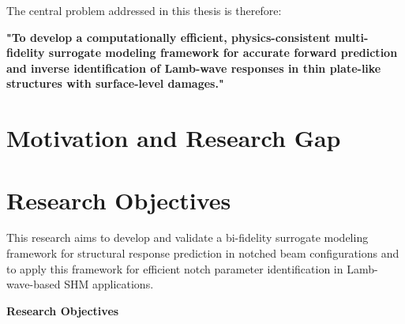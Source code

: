 \documentclass[12pt,a4paper]{report}
\begin{document}
The central problem addressed in this thesis is therefore:

\medskip

\textbf{"To develop a computationally efficient, physics-consistent multi-fidelity surrogate modeling framework for accurate forward prediction and inverse identification of Lamb-wave responses in thin plate-like structures with surface-level damages."}

\section{Motivation and Research Gap}
\label{Research Gap}




\section{Research Objectives}

This research aims to develop and validate a bi-fidelity surrogate modeling framework for structural response prediction in notched beam configurations and to apply this framework for efficient notch parameter identification in Lamb-wave-based SHM applications.

\bigskip

\noindent\textbf{Research Objectives}
\end{document}

